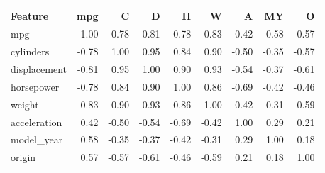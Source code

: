 \begin{tabular}{lrrrrrrrr}
\toprule
Feature & mpg & C & D & H & W & A & MY & O \\
\midrule
mpg & 1.00 & -0.78 & -0.81 & -0.78 & -0.83 & 0.42 & 0.58 & 0.57 \\
cylinders & -0.78 & 1.00 & 0.95 & 0.84 & 0.90 & -0.50 & -0.35 & -0.57 \\
displacement & -0.81 & 0.95 & 1.00 & 0.90 & 0.93 & -0.54 & -0.37 & -0.61 \\
horsepower & -0.78 & 0.84 & 0.90 & 1.00 & 0.86 & -0.69 & -0.42 & -0.46 \\
weight & -0.83 & 0.90 & 0.93 & 0.86 & 1.00 & -0.42 & -0.31 & -0.59 \\
acceleration & 0.42 & -0.50 & -0.54 & -0.69 & -0.42 & 1.00 & 0.29 & 0.21 \\
model\_year & 0.58 & -0.35 & -0.37 & -0.42 & -0.31 & 0.29 & 1.00 & 0.18 \\
origin & 0.57 & -0.57 & -0.61 & -0.46 & -0.59 & 0.21 & 0.18 & 1.00 \\
\bottomrule
\end{tabular}